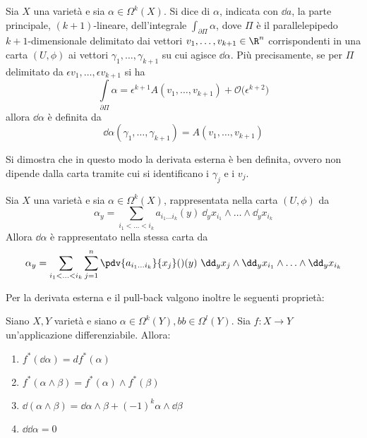 \begin{definition}
  Sia $X$ una varietà e sia $\alpha \in \Omega^k(X)$. Si dice  di $\alpha$, indicata con $\dd{a}$, la parte principale, $(k+1)$-lineare, dell'integrale $\int_{\partial \Pi} \alpha$, dove $\Pi$ è il parallelepipedo $k+1$-dimensionale delimitato dai vettori $v_1, \ldots, v_{k+1} \in \R^{n}$ corrispondenti in una carta $(U, \phi)$ ai vettori $\gamma_1, \ldots, \gamma_{k+1}$ su cui agisce $\dd\alpha$. Più precisamente, se per $\Pi$ delimitato da $\epsilon v_1, \ldots, \epsilon v_{k+1}$ si ha \begin{equation*}
    \int\limits_{\partial \Pi} \alpha = \epsilon^{k+1} A(v_1, \ldots, v_{k+1}) + \mathcal{O}\big(\epsilon^{k+2}\big)
  \end{equation*}
  allora $\dd\alpha$ è definita da \begin{equation*}
  \dd{\alpha}(\gamma_1, \ldots, \gamma_{k+1}) = A(v_1, \ldots, v_{k+1})
  \end{equation*} 
\end{definition}
\begin{remark}
  Si dimostra che in questo modo la derivata esterna è ben definita, ovvero non dipende dalla carta tramite cui si identificano i $\gamma_j$ e i $v_j$.
\end{remark}

\begin{theorem}
  Sia $X$ una varietà e sia $\alpha \in \Omega^k(X)$, rappresentata nella carta $(U, \phi)$ da \begin{equation*}
    \alpha_y = \sum_{i_1 < \ldots < i_k} a_{i_1\ldots i_k}(y)\ \dd_y x_{i_1} \wedge \ldots \wedge \dd_y x_{i_k}
    \end{equation*}
    Allora $\dd{\alpha}$ è rappresentato nella stessa carta da
    \begin{equation*}
      \alpha_y = \sum_{i_1 < \ldots < i_k} \sum_{j=1}^n \pdv{a_{i_1\ldots i_k}}{x_j}()(y)\ \dd_y x_{j} \wedge \dd_y x_{i_1} \wedge \ldots \wedge \dd_y x_{i_k}
      \end{equation*}
\end{theorem}

Per la derivata esterna e il pull-back valgono inoltre le seguenti proprietà:
\begin{theorem}
  Siano $X,Y$ varietà e siano $\alpha \in \Omega^k(Y), bb \in \Omega^l(Y)$. Sia $f:X\to Y$ un'applicazione differenziabile. Allora:
  \begin{enumerate}
    \item $f^*(\dd{\alpha}) = df^*(\alpha)$
    \item $f^*(\alpha \wedge \beta) = f^*(\alpha) \wedge f^*(\beta)$
    \item $\dd (\alpha \wedge \beta) = \dd{\alpha} \wedge \beta + (-1)^k \alpha \wedge \dd{\beta}$
    \item $\dd{\dd{\alpha}} = 0$
  \end{enumerate}
\end{theorem}

